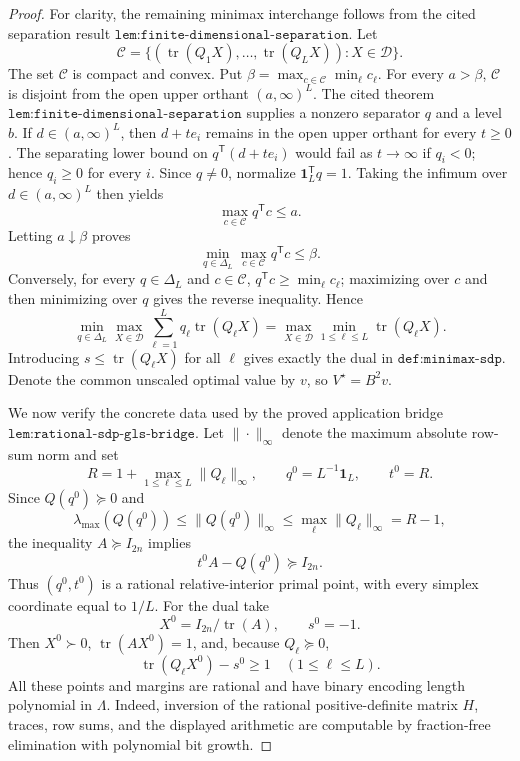 \documentclass{article}
\begin{document}
\begin{proof}
For clarity, the remaining minimax interchange follows from the cited separation result \(\texttt{lem:finite-dimensional-separation}\).  Let
\[
 \mathcal C=
 \{(\operatorname{tr}(Q_1X),\ldots,\operatorname{tr}(Q_LX)):X\in\mathcal D\}.
\]
The set \(\mathcal C\) is compact and convex.  Put \(\beta=\max_{c\in\mathcal C}\min_\ell c_\ell\).  For every \(a>\beta\), \(\mathcal C\) is disjoint from the open upper orthant \((a,\infty)^L\).  The cited theorem \(\texttt{lem:finite-dimensional-separation}\) supplies a nonzero separator \(q\) and a level \(b\). If \(d\in(a,\infty)^L\), then \(d+te_i\) remains in the open upper orthant for every \(t\ge0\). The separating lower bound on \(q^{\mathsf T}(d+te_i)\) would fail as \(t\to\infty\) if \(q_i<0\); hence \(q_i\ge0\) for every \(i\). Since \(q\ne0\), normalize \(\mathbf 1_L^{\mathsf T}q=1\). Taking the infimum over \(d\in(a,\infty)^L\) then yields
\[
 \max_{c\in\mathcal C}q^{\mathsf T}c\le a.
\]
Letting \(a\downarrow\beta\) proves
\[
 \min_{q\in\Delta_L}\max_{c\in\mathcal C}q^{\mathsf T}c\le\beta.
\]
Conversely, for every \(q\in\Delta_L\) and \(c\in\mathcal C\), \(q^{\mathsf T}c\ge\min_\ell c_\ell\); maximizing over \(c\) and then minimizing over \(q\) gives the reverse inequality.  Hence
\[
 \min_{q\in\Delta_L}\max_{X\in\mathcal D}
 \sum_{\ell=1}^Lq_\ell\operatorname{tr}(Q_\ell X)
 =\max_{X\in\mathcal D}\min_{1\le\ell\le L}
 \operatorname{tr}(Q_\ell X).
\]
Introducing \(s\le\operatorname{tr}(Q_\ell X)\) for all \(\ell\) gives exactly the dual in \(\texttt{def:minimax-sdp}\).  Denote the common unscaled optimal value by \(v\), so \(V^\star=B^2v\).

We now verify the concrete data used by the proved application bridge \(\texttt{lem:rational-sdp-gls-bridge}\).  Let \(\|\cdot\|_\infty\) denote the maximum absolute row-sum norm and set
\[
 R=1+\max_{1\le\ell\le L}\|Q_\ell\|_\infty,
 \qquad
 q^0=L^{-1}\mathbf 1_L,
 \qquad
 t^0=R.
\]
Since \(Q(q^0)\succeq0\) and
\[
 \lambda_{\max}(Q(q^0))
 \le\|Q(q^0)\|_\infty
 \le\max_\ell\|Q_\ell\|_\infty=R-1,
\]
the inequality \(A\succeq I_{2n}\) implies
\[
 t^0A-Q(q^0)\succeq I_{2n}.
\]
Thus \((q^0,t^0)\) is a rational relative-interior primal point, with every simplex coordinate equal to \(1/L\).  For the dual take
\[
 X^0=I_{2n}/\operatorname{tr}(A),
 \qquad s^0=-1.
\]
Then \(X^0\succ0\), \(\operatorname{tr}(AX^0)=1\), and, because \(Q_\ell\succeq0\),
\[
 \operatorname{tr}(Q_\ell X^0)-s^0\ge1
 \quad(1\le\ell\le L).
\]
All these points and margins are rational and have binary encoding length polynomial in \(\Lambda\).  Indeed, inversion of the rational positive-definite matrix \(H\), traces, row sums, and the displayed arithmetic are computable by fraction-free elimination with polynomial bit growth.


\end{proof}
\end{document}
